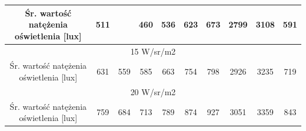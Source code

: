 \documentclass[a4paper,12pt]{article}
\begin{document}
\begin{table}[!ht]
\begin{tabular}{|c|c|c|c|c|c|c|c|c|c|}
Śr. wartość natężenia oświetlenia {[}lux{]} & \cellcolor[HTML]{F6E9C3}511                        & \cellcolor[HTML]{F6E9C3}{\color[HTML]{000000} 435} & \cellcolor[HTML]{F6E9C3}460                        & \cellcolor[HTML]{F6E9C3}536                        & \cellcolor[HTML]{F6E9C3}623                        & \cellcolor[HTML]{F6E9C3}673                        & \cellcolor[HTML]{F6E9C3}2799                       & \cellcolor[HTML]{F6E9C3}3108                       & \cellcolor[HTML]{F6E9C3}591                        \\ \hline
\multicolumn{10}{|c|}{15 W/sr/m2}                                                                                                                                                                                                                                                                                                                                                                                                                                                                                                        \\ \hline
Śr. wartość natężenia oświetlenia {[}lux{]} & \cellcolor[HTML]{F6E9C3}631                        & \cellcolor[HTML]{F6E9C3}559                        & \cellcolor[HTML]{F6E9C3}585                        & \cellcolor[HTML]{F6E9C3}663                        & \cellcolor[HTML]{F6E9C3}754                        & \cellcolor[HTML]{F6E9C3}798                        & \cellcolor[HTML]{F6E9C3}2926                       & \cellcolor[HTML]{F6E9C3}3235                       & \cellcolor[HTML]{F6E9C3}719                        \\ \hline
\multicolumn{10}{|c|}{20 W/sr/m2}                                                                                                                                                                                                                                                                                                                                                                                                                                                                                                        \\ \hline
Śr. wartość natężenia oświetlenia {[}lux{]} & \cellcolor[HTML]{F6E9C3}759                        & \cellcolor[HTML]{F6E9C3}684                        & \cellcolor[HTML]{F6E9C3}713                        & \cellcolor[HTML]{F6E9C3}789                        & \cellcolor[HTML]{F6E9C3}874                        & \cellcolor[HTML]{F6E9C3}927                        & \cellcolor[HTML]{F6E9C3}3051                       & \cellcolor[HTML]{F6E9C3}3359                       & \cellcolor[HTML]{F6E9C3}843                        \\ \hline

\end{tabular}
\end{table}
\end{document}

